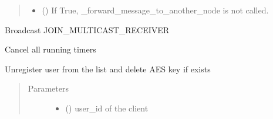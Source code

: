 \documentclass[letterpaper,10pt,english]{sphinxmanual}
\begin{document}
\begin{fulllineitems}
\begin{fulllineitems}
\begin{quote}
\begin{description}
\begin{itemize}
\item {} 
 () \textendash{} If True, \_forward\_message\_to\_another\_node is not called.

\end{itemize}

\end{description}\end{quote}

\end{fulllineitems}


\begin{fulllineitems}
\label{\detokenize{bbc1.core.user_message_routing:bbc1.core.user_message_routing.UserMessageRoutingDummy.send_multicast_join}}
Broadcast JOIN\_MULTICAST\_RECEIVER

\end{fulllineitems}


\begin{fulllineitems}
\label{\detokenize{bbc1.core.user_message_routing:bbc1.core.user_message_routing.UserMessageRoutingDummy.stop_all_timers}}
Cancel all running timers

\end{fulllineitems}


\begin{fulllineitems}
\label{\detokenize{bbc1.core.user_message_routing:bbc1.core.user_message_routing.UserMessageRoutingDummy.unregister_user}}
Unregister user from the list and delete AES key if exists
\begin{quote}\begin{description}
\item[{Parameters}] \leavevmode\begin{itemize}
\item {} 
 () \textendash{} user\_id of the client


\end{itemize}
\end{description}
\end{quote}
\end{fulllineitems}
\end{fulllineitems}
\end{document}

